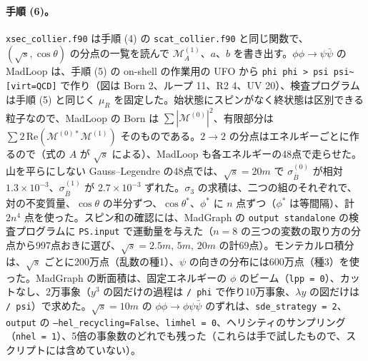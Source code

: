 \documentclass[a4paper,10pt]{ltjsarticle}
\begin{document}
\paragraph{手順 (6)。}\texttt{xsec\_collier.f90} は手順 (4) の \texttt{scat\_collier.f90} と同じ関数で、$(\sqrt s,\cos\theta)$ の分点の一覧を読んで $\mathcal M_A^{(1)}$、$a$、$b$ を書き出す。$\phi\phi\to\psi\bar\psi$ の MadLoop は、手順 (5) の on-shell の作業用の UFO から \texttt{phi phi > psi psi\textasciitilde{} [virt=QCD]} で作り（図は Born 2、ループ 11、R2 4、UV 20）、検査プログラムは手順 (5) と同じく $\mu_R$ を固定した。始状態にスピンがなく終状態は区別できる粒子なので、MadLoop の Born は $\sum|\mathcal M^{(0)}|^2$、有限部分は $\sum2\,\mathrm{Re}(\mathcal M^{(0)*}\mathcal M^{(1)})$ そのものである。$2\to2$ の分点はエネルギーごとに作るので（式の $A$ が $\sqrt s$ による）、MadLoop も各エネルギーの48点で走らせた。山を平らにしない Gauss--Legendre の48点では、$\sqrt s=20m$ で $\sigma_{\bar B}^{(0)}$ が相対 $1.3\times10^{-3}$、$\sigma_{\bar B}^{(1)}$ が $2.7\times10^{-3}$ ずれた。$\sigma_3$ の求積は、二つの組のそれぞれで、対の不変質量、$\cos\theta$ の半分ずつ、$\cos\theta^*$、$\phi^*$ に $n$ 点ずつ（$\phi^*$ は等間隔）、計 $2n^4$ 点を使った。スピン和の確認には、MadGraph の \texttt{output standalone} の検査プログラムに \texttt{PS.input} で運動量を与えた（$n=8$ の三つの変数の取り方の分点から997点おきに選び、$\sqrt s=2.5m,\,5m,\,20m$ の計69点）。モンテカルロ積分は、$\sqrt s$ ごとに200万点（乱数の種1）、$\psi$ の向きの分布には600万点（種3）を使った。MadGraph の断面積は、固定エネルギーの $\phi$ のビーム（\texttt{lpp = 0}）、カットなし、2万事象（$y^3$ の図だけの過程は \texttt{/ phi} で作り10万事象、$\lambda y$ の図だけは \texttt{/ psi}）で求めた。$\sqrt s=10m$ の $\phi\phi\to\phi\psi\bar\psi$ のずれは、\texttt{sde\_strategy = 2}、\texttt{output} の \texttt{--hel\_recycling=False}、\texttt{limhel = 0}、ヘリシティのサンプリング（\texttt{nhel = 1}）、5倍の事象数のどれでも残った（これらは手で試したもので、スクリプトには含めていない）。
\end{document}
